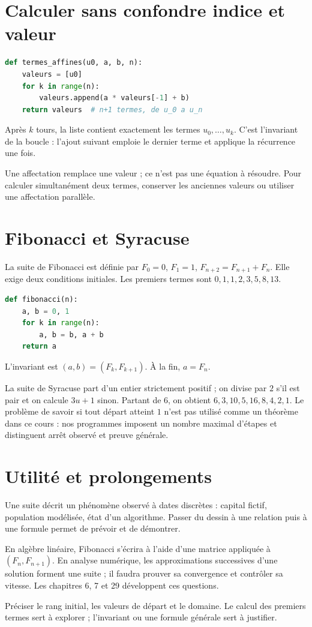\documentclass[../cours_1re.tex]{subfiles}
\begin{document}
\section{Calculer sans confondre indice et valeur}
\begin{lstlisting}[language=Python]
def termes_affines(u0, a, b, n):
    valeurs = [u0]
    for k in range(n):
        valeurs.append(a * valeurs[-1] + b)
    return valeurs  # n+1 termes, de u_0 a u_n
\end{lstlisting}
Après $k$ tours, la liste contient exactement les termes $u_0,\ldots,u_k$. C'est l'invariant de la boucle : l'ajout suivant emploie le dernier terme et applique la récurrence une fois.
\begin{attention}
Une affectation remplace une valeur ; ce n'est pas une équation à résoudre. Pour calculer simultanément deux termes, conserver les anciennes valeurs ou utiliser une affectation parallèle.
\end{attention}
\begin{finchapitre}
\section{Fibonacci et Syracuse}
La suite de Fibonacci est définie par $F_0=0$, $F_1=1$, $F_{n+2}=F_{n+1}+F_n$. Elle exige deux conditions initiales. Les premiers termes sont $0,1,1,2,3,5,8,13$.
\begin{lstlisting}[language=Python]
def fibonacci(n):
    a, b = 0, 1
    for k in range(n):
        a, b = b, a + b
    return a
\end{lstlisting}
L'invariant est $(a,b)=(F_k,F_{k+1})$. À la fin, $a=F_n$.

La suite de Syracuse part d'un entier strictement positif ; on divise par $2$ s'il est pair et on calcule $3u+1$ sinon. Partant de $6$, on obtient $6,3,10,5,16,8,4,2,1$.
Le problème de savoir si tout départ atteint $1$ n'est pas utilisé comme un théorème dans ce cours : nos programmes imposent un nombre maximal d'étapes et distinguent arrêt observé et preuve générale.


\section{Utilité et prolongements}
Une suite décrit un phénomène observé à dates discrètes : capital fictif, population modélisée, état d'un algorithme. Passer du dessin à une relation puis à une formule permet de prévoir et de démontrer.

En algèbre linéaire, Fibonacci s'écrira à l'aide d'une matrice appliquée à $(F_n,F_{n+1})$. En analyse numérique, les approximations successives d'une solution forment une suite ; il faudra prouver sa convergence et contrôler sa vitesse. Les chapitres 6, 7 et 29 développent ces questions.
\begin{retenir}
Préciser le rang initial, les valeurs de départ et le domaine. Le calcul des premiers termes sert à explorer ; l'invariant ou une formule générale sert à justifier.
\end{retenir}
\end{finchapitre}
\end{document}
